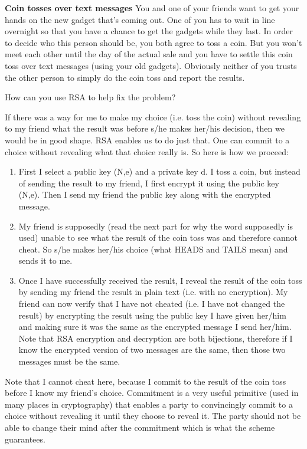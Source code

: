 \question \textbf{Coin tosses over text messages} \newline
You and one of your friends want to get your hands on the new gadget 
that’s coming out. One of you has to wait in line overnight so that 
you have a chance to get the gadgets while they last. In order to 
decide who this person should be, you both agree to toss a coin. But 
you won’t meet each other until the day of the actual sale and you 
have to settle this coin toss over text messages (using your old gadgets). 
Obviously neither of you trusts the other person to simply do the coin 
toss and report the results.\newline
					
How can you use RSA to help fix the problem?	
\begin{solution}
If there was a way for me to make my choice (i.e. toss the coin) 
without revealing to my friend what the result was before s/he makes 
her/his decision, then we would be in good shape.
RSA enables us to do just that. One can commit to a choice without 
revealing what that choice really is. So here is how we proceed: 
\begin{enumerate}

\item First I select a public key (N,e) and a private key d. I toss a 
coin, but instead of sending the result to my friend, I first encrypt 
it using the public key (N,e). Then I send my friend the public key 
along with the encrypted message. 
\item My friend is supposedly (read the next part for why the word 
supposedly is used) unable to see what the result of the coin toss was 
and therefore cannot cheat. So s/he makes her/his choice (what HEADS 
and TAILS mean) and sends it to me.	
\item Once I have successfully received the result, I reveal the 
result of the coin toss by sending my friend the result in plain text 
(i.e. with no encryption). My friend can now verify that I have not 
cheated (i.e. I have not changed the result) by encrypting the result 
using the public key I have given her/him and making sure it was the 
same as the encrypted message I send her/him. Note that RSA encryption 
and decryption are both bijections, therefore if I know the encrypted 
version of two messages are the same, then those two messages must be 
the same.	
\end{enumerate}					
Note that I cannot cheat here, because I commit to the result of the 
coin toss before I know my friend’s choice. Commitment is a very useful 
primitive (used in many places in cryptography) that enables a party 
to convincingly commit to a choice without revealing it until they 
choose to reveal it. The party should not be able to change their 
mind after the commitment which is what the scheme guarantees. 
\end{solution}

\clearpage